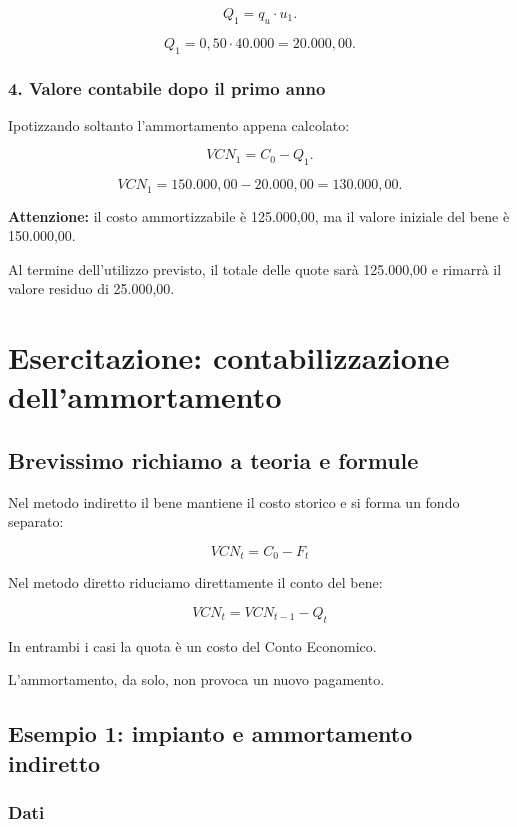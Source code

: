 \[
Q_1=q_u\cdot u_1.
\]

\[
Q_1=0{,}50\cdot40.000
=
\boxed{20.000{,}00}.
\]


\subsubsection*{4. Valore contabile dopo il primo anno}

\noindent Ipotizzando soltanto
l'ammortamento appena calcolato:

\[
VCN_1=C_0-Q_1.
\]

\[
VCN_1=
150.000{,}00-20.000{,}00
=
\boxed{130.000{,}00}.
\]

\noindent \textbf{Attenzione:}
il costo ammortizzabile è 125.000,00,
ma il valore iniziale del bene
è 150.000,00.

\noindent Al termine dell'utilizzo previsto,
il totale delle quote sarà 125.000,00
e rimarrà il valore residuo di 25.000,00.


\section{Esercitazione:
contabilizzazione dell'ammortamento}

\subsection{Brevissimo richiamo a teoria e formule}

\noindent Nel metodo indiretto
il bene mantiene il costo storico
e si forma un fondo separato:

\[
\boxed{
VCN_t=C_0-F_t
}
\]

\noindent Nel metodo diretto
riduciamo direttamente il conto del bene:

\[
\boxed{
VCN_t=VCN_{t-1}-Q_t
}
\]

\noindent In entrambi i casi
la quota è un costo del Conto Economico.

\noindent L'ammortamento,
da solo, non provoca
un nuovo pagamento.


\subsection{Esempio 1:
impianto e ammortamento indiretto}

\subsubsection*{Dati}

